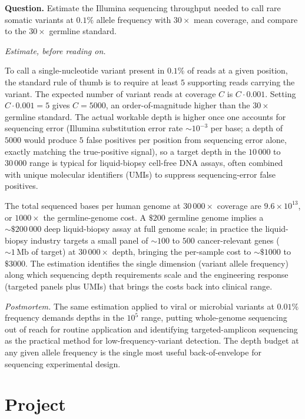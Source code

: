 \begin{estimation}
\textbf{Question.} Estimate the Illumina sequencing throughput needed
to call rare somatic variants at $0.1\%$ allele frequency with
$30\times$ mean coverage, and compare to the $30\times$ germline
standard.

\smallskip
\textit{Estimate, before reading on.}

\smallskip
To call a single-nucleotide variant present in $0.1\%$ of reads at a
given position, the standard rule of thumb is to require at least
$5$ supporting reads carrying the variant. The expected number of
variant reads at coverage $C$ is $C \cdot 0.001$. Setting $C \cdot
0.001 = 5$ gives $C = 5000$, an order-of-magnitude higher than the
$30 \times$ germline standard. The actual workable depth is higher
once one accounts for sequencing error (Illumina substitution error
rate $\sim 10^{-3}$ per base; a depth of $5000$ would produce $5$
false positives per position from sequencing error alone, exactly
matching the true-positive signal), so a target depth in the
$10\,000$ to $30\,000$ range is typical for liquid-biopsy cell-free
DNA assays, often combined with unique molecular identifiers (UMIs)
to suppress sequencing-error false positives.

The total sequenced bases per human genome at $30\,000 \times$ coverage
are $9.6 \times 10^{13}$, or $1000 \times$ the germline-genome cost.
A $\$200$ germline genome implies a $\sim \$200\,000$ deep
liquid-biopsy assay at full genome scale; in practice the
liquid-biopsy industry targets a small panel of $\sim 100$ to
$500$ cancer-relevant genes ($\sim 1\,\text{Mb}$ of target) at
$30\,000 \times$ depth, bringing the per-sample cost to
$\sim \$1000$ to $\$3000$. The estimation identifies the
single dimension (variant allele frequency) along which sequencing
depth requirements scale and the engineering response
(targeted panels plus UMIs) that brings the costs back into clinical
range.

\smallskip
\textit{Postmortem.} The same estimation applied to viral or
microbial variants at $0.01\%$ frequency demands depths in the
$10^5$ range, putting whole-genome sequencing out of reach for
routine application and identifying targeted-amplicon sequencing as
the practical method for low-frequency-variant detection. The depth
budget at any given allele frequency is the single most useful
back-of-envelope for sequencing experimental design.
\end{estimation}

\section{Project}

